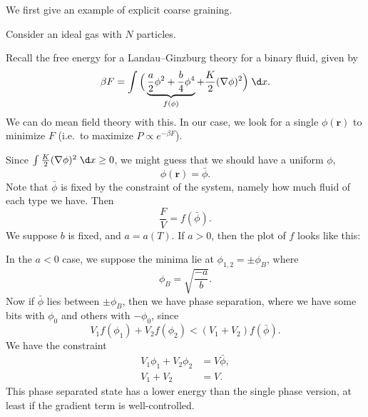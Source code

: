 \documentclass[a4paper]{article}
\begin{document}
We first give an example of explicit coarse graining.
\begin{eg}
  Consider an ideal gas with $N$ particles.
\end{eg}

Recall the free energy for a Landau--Ginzburg theory for a binary fluid, given by
\[
  \beta F = \int \Big(\underbrace{\frac{a}{2} \phi^2 + \frac{b}{4} \phi^4}_{f(\phi)} + \frac{K}{2} (\nabla \phi)^2\Big)\;\d x.
\]
We can do mean field theory with this. In our case, we look for a single $\phi(\mathbf{r})$ to minimize $F$ (i.e.\ to maximize $P \propto e^{-\beta F}$).

Since $\int \frac{K}{2} (\nabla \phi)^2\;\d x \geq 0$, we might guess that we should have a uniform $\phi$,
\[
  \phi(\mathbf{r}) = \bar{\phi}.
\]
Note that $\bar{\phi}$ is fixed by the constraint of the system, namely how much fluid of each type we have. Then
\[
  \frac{F}{V} = f(\bar{\phi}).
\]
We suppose $b$ is fixed, and $a = a(T)$. If $a > 0$, then the plot of $f$ looks like this:
\begin{center}
  \begin{tikzpicture}
  \end{tikzpicture}
\end{center}
In the $a < 0$ case, we suppose the minima lie at $\phi_{1, 2} = \pm \phi_B$, where
\[
  \phi_B = \sqrt{\frac{-a}{b}}.
\]
Now if $\bar{\phi}$ lies between $\pm \phi_B$, then we have phase separation, where we have some bits with $\phi_0$ and others with $-\phi_0$, since
\[
  V_1 f(\phi_1) + V_2 f(\phi_2) < (V_1 + V_2) f(\bar{\phi}).
\]
We have the constraint
\begin{align*}
  V_1 \phi_1 + V_2 \phi_2 &= V \bar{\phi},\\
  V_1 + V_2 &= V.
\end{align*}
This phase separated state has a lower energy than the single phase version, at least if the gradient term is well-controlled.
\end{document}
